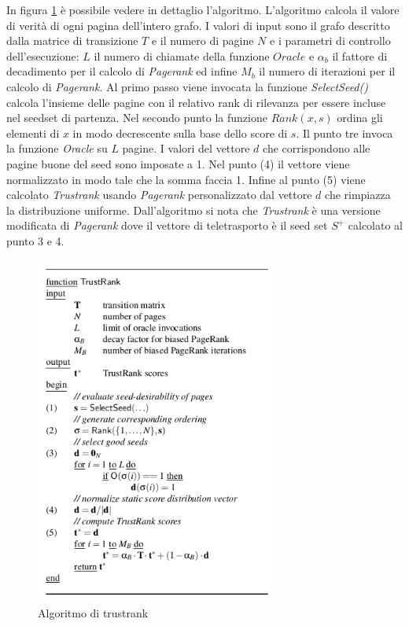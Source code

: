 In figura \ref{fig:trustrank1} è possibile vedere in dettaglio l'algoritmo. L'algoritmo calcola il valore di verità di ogni pagina dell'intero grafo. I valori di input sono il grafo descritto dalla matrice di transizione \(T\) e il numero di pagine \(N\) e i parametri di controllo dell'esecuzione: \(L\) il numero di chiamate della funzione \(Oracle\) e \(\alpha_b\) il fattore di decadimento per il calcolo di \textit{Pagerank} ed infine \(M_b\) il numero di iterazioni per il calcolo di \textit{Pagerank}. Al primo passo viene invocata la funzione \textit{SelectSeed()} calcola l'insieme delle pagine con il relativo rank di rilevanza per essere incluse nel seedset di partenza. Nel secondo punto la funzione \(Rank(x,s)\) ordina gli elementi di \(x\) in modo decrescente sulla base dello score di \(s\). Il punto tre invoca la funzione \textit{Oracle} su \(L\) pagine. I valori del vettore \(d\) che corrispondono alle pagine buone del seed sono imposate a 1. Nel punto (4) il vettore viene normalizzato in modo tale 
che la somma faccia 1. Infine al punto (5) viene calcolato \textit{Trustrank} usando \textit{Pagerank} personalizzato dal vettore \(d\) che rimpiazza la distribuzione uniforme. Dall'algoritmo si nota che \textit{Trustrank} è una versione modificata di \textit{Pagerank} dove il vettore di teletrasporto è il seed set \(S^+\) calcolato al punto 3 e 4.
\begin{figure}
\centering
\includegraphics[width=8cm]{immagini/trustrank/trustrank}
\caption{Algoritmo di trustrank}
\label{fig:trustrank1}
\end{figure}

